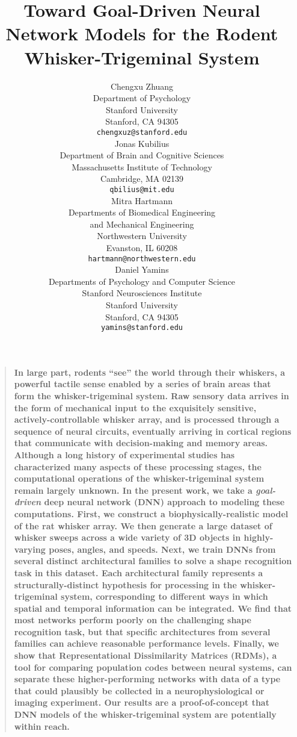 \documentclass{article}
\title{Toward Goal-Driven Neural Network Models for the Rodent Whisker-Trigeminal System}
\author{
Chengxu Zhuang\\
Department of Psychology\\
Stanford University\\
Stanford, CA 94305 \\
\texttt{chengxuz@stanford.edu} \\
\And
Jonas Kubilius \\
Department of Brain and Cognitive Sciences \\
Massachusetts Institute of Technology \\
Cambridge, MA  02139\\
\texttt{qbilius@mit.edu} \\
\And
Mitra Hartmann \\
Departments of Biomedical Engineering \\
and Mechanical Engineering \\
Northwestern University \\
Evanston, IL  60208\\
\texttt{hartmann@northwestern.edu} \\
\And
Daniel Yamins \\
Departments of Psychology and Computer Science \\
Stanford Neurosciences Institute \\
Stanford University \\
Stanford, CA 94305 \\
\texttt{yamins@stanford.edu} \\
}
\newenvironment{sciabstract}{%
\begin{quote} \bf}
{\end{quote}}
\begin{document}

\maketitle

\begin{sciabstract}
In large part, rodents ``see'' the world through their whiskers, a powerful tactile sense enabled by a series of brain areas that form the whisker-trigeminal system. 
Raw sensory data arrives in the form of mechanical input to the exquisitely sensitive, actively-controllable whisker array, and is processed through a sequence of neural circuits, eventually arriving in cortical regions that communicate with decision-making and memory areas.
Although a long history of experimental studies has characterized many aspects of these processing stages, the computational operations of the whisker-trigeminal system remain largely unknown.
In the present work, we take a \emph{goal-driven} deep neural network (DNN) approach to modeling these computations.
First, we construct a biophysically-realistic model of the rat whisker array.  
We then generate a large dataset of whisker sweeps across a wide variety of 3D objects in highly-varying poses, angles, and speeds.
Next, we train DNNs from several distinct architectural families to solve a shape recognition task in this dataset. 
Each architectural family represents a structurally-distinct hypothesis for processing in the whisker-trigeminal system,  corresponding to different ways in which spatial and temporal information can be integrated.
We find that most networks perform poorly on the challenging shape recognition task, but that specific architectures from several families can achieve reasonable performance levels.
Finally, we show that Representational Dissimilarity Matrices (RDMs), a tool for comparing population codes between neural systems, can separate these higher-performing networks with data of a type that could plausibly be collected in a neurophysiological or imaging experiment.
Our results are a proof-of-concept that DNN models of the whisker-trigeminal system are potentially within reach.
\end{sciabstract}

\end{document}
